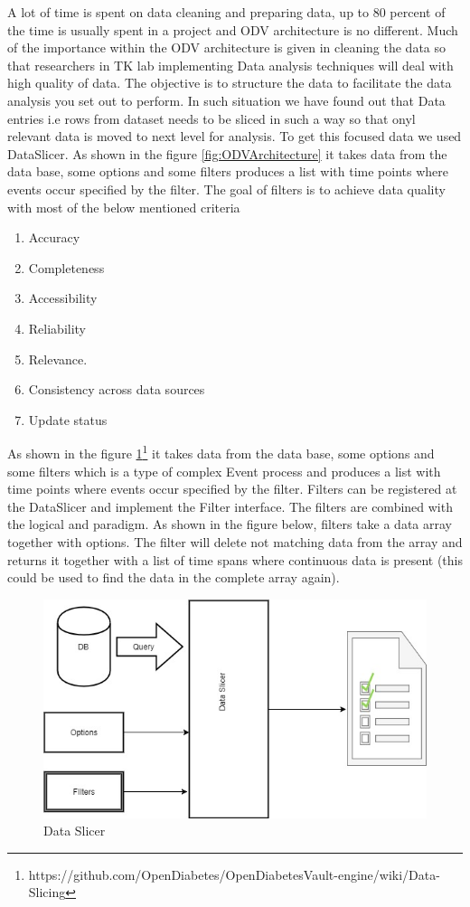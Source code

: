 \documentclass[article,type=msc,colorback,accentcolor=tud9c,twoside,11pt]{tudthesis}
\begin{document}
	A lot of time is spent on data cleaning and preparing data, up to 80 percent \cite{TinyData} of the time is usually spent in a project and ODV architecture is no different. Much of the importance within the ODV architecture is given in cleaning the data so that researchers in TK lab implementing Data analysis techniques will deal with high quality of data. The objective is to structure the data to facilitate the data analysis you set out to perform. In such situation we have found out that Data entries i.e rows from dataset needs to be sliced in such a way so that onyl relevant data is moved to next level for analysis. To get this focused data we used DataSlicer. As shown in the figure \ref{fig:ODVArchitecture} it takes data from the data base, some options and some filters produces a list with time points where events occur specified by the filter. The goal of filters is to achieve data quality with most of the below mentioned criteria
	\begin{enumerate}
		\item Accuracy
		\item Completeness
		\item Accessibility
		\item Reliability
		\item Relevance.
		\item Consistency across data sources
		\item Update status
	\end{enumerate}
	As shown in the figure \ref{fig:Dataslicer}\footnote{https://github.com/OpenDiabetes/OpenDiabetesVault-engine/wiki/Data-Slicing} it takes data from the data base, some options and some filters which is a type of complex Event process \cite{EventProcessing} and produces a list with time points where events occur specified by the filter. Filters can be registered at the DataSlicer and implement the Filter interface. The filters are combined with the logical and paradigm. As shown in the figure below, filters take a data array together with options. The filter will delete not matching data from the array and returns it together with a list of time spans where continuous data is present (this could be used to find the data in the complete array again). 
	\begin{figure}[h]
		\centering
		\includegraphics[scale=0.7]{Dataslicer.jpg}
		\caption{Data Slicer}
		\label{fig:Dataslicer}
	\end{figure}
	
\end{document}
